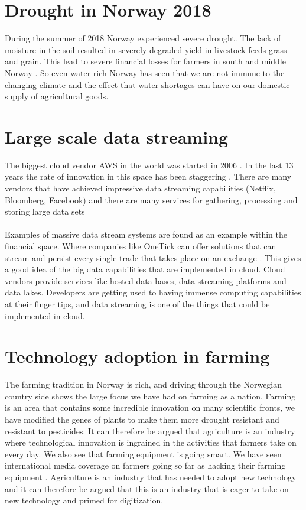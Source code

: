 \documentclass[]{uiophd}
\begin{document}
\section{Drought in Norway 2018}
 During the summer of 2018 Norway experienced severe drought. The lack of moisture in the soil resulted in severely degraded yield in livestock feeds grass and grain. This lead to severe financial losses for farmers in south and middle Norway \cite{nve}. So even water rich Norway has seen that we are not immune to the changing climate and the effect that water shortages can have on our domestic supply of agricultural goods. 

\section{Large scale data streaming }
The biggest cloud vendor AWS in the world was started in 2006 \cite{Gartner}. In the last 13 years the rate of innovation in this space has been staggering \cite{AWS}. There are many vendors that have achieved impressive data streaming capabilities (Netflix, Bloomberg, Facebook) and there are many services for gathering, processing and storing large data sets
\\\\
Examples of massive data stream systems are found as an example within the financial space. Where companies like OneTick can offer solutions that can stream and persist every single trade that takes place on an exchange  \cite{OneTick}. This gives a good idea of the big data capabilities that are implemented in cloud. Cloud vendors provide services like hosted data bases, data streaming platforms and data lakes. Developers are getting used to having immense computing capabilities at their finger tips, and data streaming is one of the things that could be implemented in cloud.  
\section{Technology adoption in farming}
The farming tradition in Norway is rich, and driving through the Norwegian country side shows the large focus we have had on farming as a nation. Farming is an area that contains some incredible innovation on many scientific fronts, we have modified the genes of plants to make them more drought resistant and resistant to pesticides. It can therefore be argued that agriculture is an industry where technological innovation is ingrained in the activities that farmers take on every day. We also see that farming equipment is going smart. We have seen international media coverage on farmers going so far as hacking their farming equipment \cite{motherboard}. Agriculture is an industry that has needed to adopt new technology and it can therefore be argued that this is an industry that is eager to take on new technology and primed for digitization.
\end{document}
